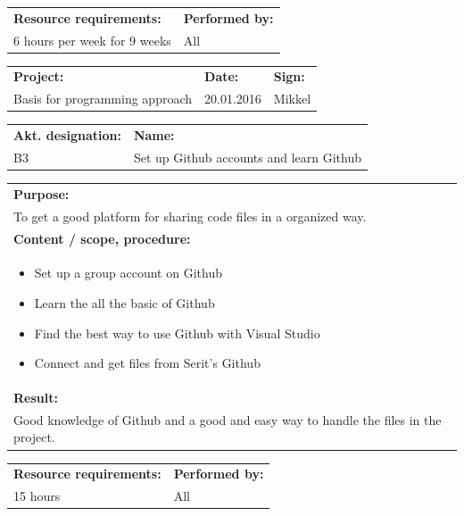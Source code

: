 \documentclass[12pt, a4paper]{article}
\begin{document}
\begin{tabularx}{\textwidth}{|X|p{30mm}|}
	\textbf{Resource requirements:}&\textbf{Performed by:}\\
	6 hours per week for 9 weeks&All\\
	\hline
\end{tabularx}

\newpage

\begin{tabularx}{\textwidth}{|X|p{32mm}|p{20mm}|}
	\hline
	\textbf{Project:}&\textbf{Date:}&\textbf{Sign:}\\
	Basis for programming approach&20.01.2016&Mikkel\\
	\hline
\end{tabularx}

\begin{tabularx}{\textwidth}{|p{40mm}|X|}
	\textbf{Akt. designation:}&\textbf{Name:}\\
	B3&Set up Github accounts and learn Github\\
	\hline
\end{tabularx}

\begin{tabularx}{\textwidth}{|X|}
	\textbf{Purpose:}\\
	To get a good platform for sharing code files in a organized way.\\
	\hline
	\textbf{Content / scope, procedure:}\\
	\begin{itemize}[noitemsep,topsep=0pt]
		\item Set up a group account on Github
		\item Learn the all the basic of Github
 		\item Find the best way to use Github with Visual Studio
		\item Connect and get files from Serit’s Github

	\end{itemize}\\
 	\hline
	\textbf{Result:}\\
	Good knowledge of Github and a good and easy way to handle the files in the project.\\
	\hline
\end{tabularx}

\begin{tabularx}{\textwidth}{|X|p{30mm}|}
	\textbf{Resource requirements:}&\textbf{Performed by:}\\
	15 hours&All\\
	\hline
\end{tabularx}
\end{document}
